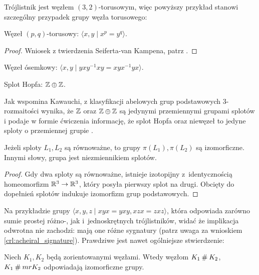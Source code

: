 Trójlistnik jest węzłem $(3, 2)$-torusowym, więc powyższy przykład stanowi szczególny przypadek grupy węzła torusowego:

\begin{example}
    Węzeł $(p,q)$-torusowy: $\langle x, y \mid x^p = y^q \rangle$.
\end{example}

\begin{proof}
    Wniosek z twierdzenia Seiferta-van Kampena, patrz \cite[s. 77]{kawauchi96}.
\end{proof}

\begin{example}
    Węzeł ósemkowy: $\langle x, y \mid yxy^{{-1}}xy=xyx^{{-1}}yx \rangle$.
\end{example}

\begin{example}
    Splot Hopfa: $\mathbb Z \oplus \mathbb Z$.
\end{example}

Jak wspomina Kawauchi, z klasyfikacji abelowych grup podstawowych 3-rozmaitości wynika, że $\mathbb Z$ oraz $\mathbb Z \oplus \mathbb Z$ są jedynymi przemiennymi grupami splotów i podaje w formie ćwiczenia informację, że splot Hopfa oraz niewęzeł to jedyne sploty o przemiennej grupie \cite[s. 83]{kawauchi96}.

\begin{proposition}
    \label{prop:knot_group_invariant}
    Jeżeli sploty $L_1, L_2$ są równoważne, to grupy $\pi(L_1), \pi(L_2)$ są izomorficzne.
    Innymi słowy, grupa jest niezmiennikiem splotów.
\end{proposition}

\begin{proof}
    Gdy dwa sploty są równoważne, istnieje izotopijny z~identycznością homeomorfizm $\mathbb R^3 \to \mathbb R^3$, który posyła pierwszy splot na drugi.
    Obcięty do dopełnień splotów indukuje izomorfizm grup podstawowych.
\end{proof}

Na przykładzie grupy $\langle x,y,z \mid xyx=yxy,xzx=zxz\rangle$, która odpowiada zarówno sumie prostej różno-, jak i~jednoskrętnych trójlistników, widać że implikacja odwrotna nie zachodzi: mają one różne sygnatury (patrz uwaga za wnioskiem \ref{crl:acheiral_signature}).
Prawdziwe jest nawet ogólniejsze stwierdzenie:

\begin{proposition}
    \label{prop:knot_group_sum}
    Niech $K_1, K_2$ będą zorientowanymi węzłami.
    Wtedy węzłom $K_1 \mathbin{\#} K_2$, $K_1 \mathbin{\#} mr K_2$ odpowiadają izomorficzne grupy.
\end{proposition}

